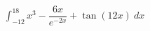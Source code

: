 \documentclass[preview]{standalone}
\begin{document}
\begin{align*}
\int_{-12}^{18} x^3 - \dfrac{6x}{e^{-2x}}+ \tan (12x) \ dx
\end{align*}
\end{document}
